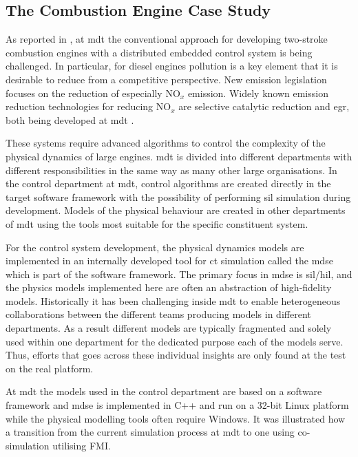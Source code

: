 \subsection{The Combustion Engine Case Study}

As reported in \cite{Pedersen&17}, at \ac{mdt} the conventional approach for
developing two-stroke combustion engines with a distributed embedded control
system is being challenged. In particular, for diesel engines pollution is a
key element that it is desirable to reduce from a competitive perspective. New
emission legislation focuses on the reduction of especially NO$_x$ emission.
Widely known emission reduction technologies for reducing NO$_x$ are selective
catalytic reduction and \ac{egr}, both being developed at \ac{mdt}
\cite{Pedersen&17}.

These systems require advanced algorithms to control the complexity of the
physical dynamics of large engines. \ac{mdt} is divided into different
departments with different responsibilities in the same way as many other large
organisations. In the control department at \ac{mdt}, control algorithms are
created directly in the target software framework with the possibility of
performing \ac{sil} simulation during development.  Models of the physical
behaviour are created in other departments of \ac{mdt} using the tools most
suitable for the specific constituent system.

For the control system development, the physical dynamics models are
implemented in an internally developed tool for \ac{ct} simulation called the
\ac{mdse} which is part of the software framework. The primary focus in
\ac{mdse} is \ac{sil}/\ac{hil}, and the physics models implemented here are
often an abstraction of high-fidelity models. Historically it has been
challenging inside \ac{mdt} to enable heterogeneous collaborations between the
different teams producing models in different departments. As a result
different models are typically fragmented and solely used within one department
for the dedicated purpose each of the models serve. Thus, efforts that goes
across these individual insights are only found at the test on the real
platform.


At \ac{mdt} the models used in the control department are based on a software
framework and \ac{mdse} is implemented in C++ and run on a 32-bit Linux
platform while the physical modelling tools often require Windows. It was illustrated how a transition from the current
simulation process at \ac{mdt} to one using co-simulation utilising FMI.

